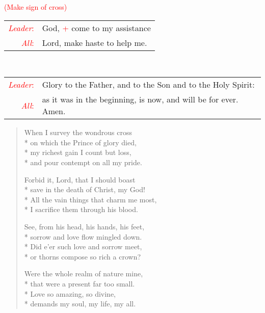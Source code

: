\documentclass[letterpaper,14pt]{extarticle}
\newcommand{\sidestar}[1]{\textcolor{red}{\textit{#1}:}}
\newcommand{\rednote}[1]{\textcolor{red}{#1}}
\newcommand{\intercession}[2]{
	\begin{tabular}[h]{r p{4.25in}}
		\sidestar{Leader} & #1 \\
		\sidestar{All} & #2
	\end{tabular}}
\begin{document}
\hspace{\leftmargini}\rednote{(Make sign of cross)}\\
\intercession{God, \rednote{+} come to my assistance}
{Lord, make haste to help me.}\\
\intercession{Glory to the Father, and to the Son and to the Holy Spirit:}
{as it was in the beginning, is now, and will be for ever. Amen.}

\begin{verse}
When I survey the wondrous cross \\*
on which the Prince of glory died, \\*
my richest gain I count but loss, \\*
and pour contempt on all my pride.

Forbid it, Lord, that I should boast \\*
save in the death of Christ, my God! \\*
All the vain things that charm me most, \\*
I sacrifice them through his blood.

See, from his head, his hands, his feet, \\*
sorrow and love flow mingled down. \\*
Did e'er such love and sorrow meet, \\*
or thorns compose so rich a crown?

Were the whole realm of nature mine, \\*
that were a present far too small. \\*
Love so amazing, so divine, \\*
demands my soul, my life, my all.
\end{verse}
\pagebreak
\end{document}
